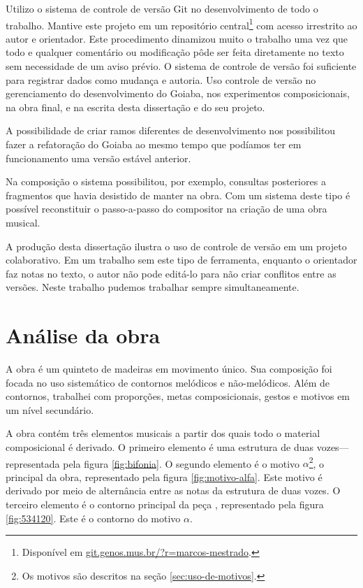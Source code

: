 Utilizo o sistema de controle de versão Git no desenvolvimento de todo
o trabalho. Mantive este projeto em um repositório
central\footnote{Disponível em
  \url{git.genos.mus.br/?r=marcos-mestrado}.} com acesso irrestrito ao
autor e orientador. Este procedimento dinamizou muito o trabalho uma
vez que todo e qualquer comentário ou modificação pôde ser feita
diretamente no texto sem necessidade de um aviso prévio. O sistema de
controle de versão foi suficiente para registrar dados como mudança e
autoria. Uso controle de versão no gerenciamento do desenvolvimento do
Goiaba, nos experimentos composicionais, na obra final, e na escrita
desta dissertação e do seu projeto.

A possibilidade de criar ramos diferentes de desenvolvimento nos
possibilitou fazer a refatoração do Goiaba ao mesmo tempo que podíamos
ter em funcionamento uma versão estável anterior.

Na composição o sistema possibilitou, por exemplo, consultas
posteriores a fragmentos que havia desistido de manter na obra. Com um
sistema deste tipo é possível reconstituir o passo-a-passo do
compositor na criação de uma obra musical.

A produção desta dissertação ilustra o uso de controle de versão em um
projeto colaborativo. Em um trabalho sem este tipo de ferramenta,
enquanto o orientador faz notas no texto, o autor não pode editá-lo
para não criar conflitos entre as versões. Neste trabalho pudemos
trabalhar sempre simultaneamente.

\chapter{Análise da obra \obra{}}
\label{cha:anal-da-obra}

A obra \obra{} é um quinteto de madeiras em movimento único. Sua
composição foi focada no uso sistemático de contornos melódicos e
não-melódicos. Além de contornos, trabalhei com proporções, metas
composicionais, gestos e motivos em um nível secundário.

A obra contém três elementos musicais a partir dos quais todo o
material composicional é derivado. O primeiro elemento é uma estrutura
de duas vozes---representada pela figura \ref{fig:bifonia}. O segundo
elemento é o motivo $\alpha$\footnote{Os motivos são descritos na
  seção \ref{sec:uso-de-motivos}.}, o principal da obra, representado
pela figura \ref{fig:motivo-alfa}. Este motivo é derivado por meio de
alternância entre as notas da estrutura de duas vozes. O terceiro
elemento é o contorno principal da peça \contpr{}, representado pela
figura \ref{fig:534120}. Este é o contorno do motivo $\alpha$.

